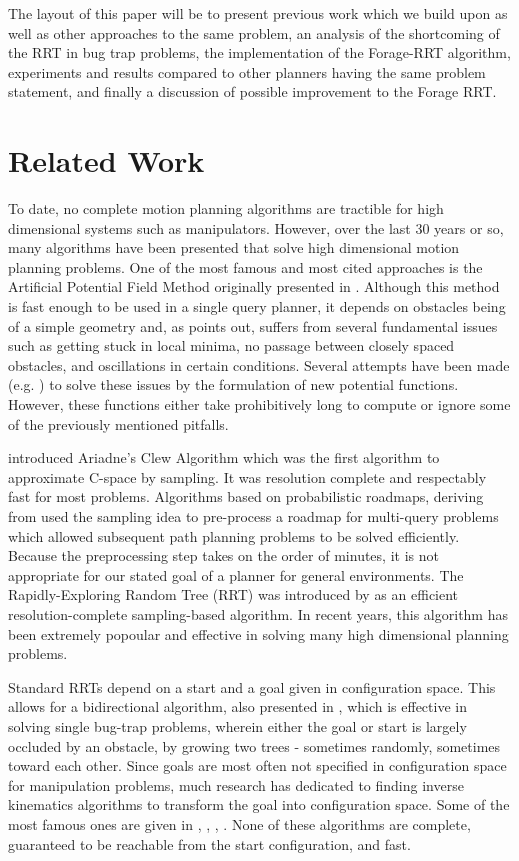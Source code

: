 \documentclass[conference]{IEEEtran}
\begin{document}
The layout of this paper will be to present previous work which we build upon as well as other approaches to the same problem, an analysis
of the shortcoming of the RRT in bug trap problems, the implementation of the Forage-RRT algorithm, experiments and results compared to
other planners having the same problem statement, and finally a discussion of possible improvement to the Forage RRT.   

\section{Related Work}
To date, no complete motion planning algorithms are tractible for high dimensional systems such as manipulators. However, over the last 30
years or so, many algorithms have been presented that solve high dimensional motion planning problems. One of the most famous and most cited
approaches is the Artificial Potential Field Method originally presented in \cite{khatib86}. Although this method is fast enough to be
used in a single query planner, it depends on obstacles being of a simple geometry and, as \cite{koren91} points out, suffers from several
fundamental issues such as getting stuck in local minima, no passage between closely spaced obstacles, and oscillations in certain
conditions. Several attempts have been made (e.g. \cite{connolly90} \cite{ge00}) to solve these issues by the formulation of new potential
functions. However, these functions either take prohibitively long to compute or ignore some of the previously mentioned pitfalls. 

\cite{bessiere93} introduced Ariadne's Clew Algorithm which was the first algorithm to approximate C-space by sampling. It was resolution
complete and respectably fast for most problems. Algorithms based on probabilistic roadmaps, deriving from \cite{amato96} used the sampling
idea to pre-process a roadmap for multi-query problems which allowed subsequent path planning problems to be solved efficiently. Because the
preprocessing step takes on the order of minutes, it is not appropriate for our stated goal of a planner for general environments. The
Rapidly-Exploring Random Tree (RRT) was introduced by \cite{lavalle00} as an efficient resolution-complete sampling-based algorithm. In
recent years, this algorithm has been extremely popoular and effective in solving many high dimensional planning problems.

Standard RRTs depend on a start and a goal given in configuration space. This allows for a bidirectional algorithm, also presented in
\cite{lavalle00}, which is effective in solving single bug-trap problems, wherein either the goal or start is largely occluded by an
obstacle, by growing two trees - sometimes randomly, sometimes toward each other. Since goals are most often not specified in configuration
space for manipulation problems, much research has dedicated to finding inverse kinematics algorithms to transform the goal into
configuration space. Some of the most famous ones are given in \cite{goldenberg85}, \cite{guez88}, \cite{chang87}, \cite{parker89}. None of
these algorithms are complete, guaranteed to be reachable from the start configuration, and fast. 
\end{document}
